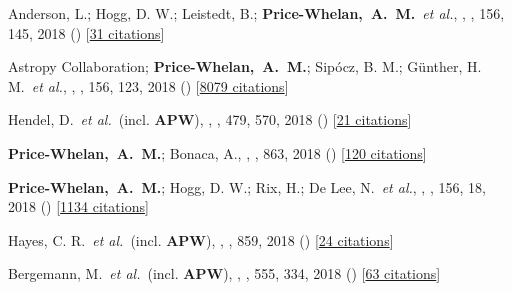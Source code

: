 {\item[{\color{deemph}\scriptsize44}]Anderson, L.; Hogg, D. W.; Leistedt, B.; \textbf{Price-Whelan,~A.~M.}~\textit{et al.}, , \aj, 156, 145, 2018 () [\href{http://adsabs.harvard.edu/abs/2018AJ....156..145A}{31 citations}]

\item[{\color{deemph}\scriptsize43}]Astropy Collaboration; \textbf{Price-Whelan,~A.~M.}; Sip{\'{o}}cz, B. M.; G{\"u}nther, H. M.~\textit{et al.}, , \aj, 156, 123, 2018 () [\href{http://adsabs.harvard.edu/abs/2018AJ....156..123A}{8079 citations}]

\item[{\color{deemph}\scriptsize42}]Hendel, D.~\textit{et al.}~(incl. \textbf{APW}), , \mnras, 479, 570, 2018 () [\href{http://adsabs.harvard.edu/abs/2018MNRAS.479..570H}{21 citations}]

\item[{\color{deemph}\scriptsize41}]\textbf{Price-Whelan,~A.~M.}; Bonaca, A., , \apj, 863, 2018 () [\href{http://adsabs.harvard.edu/abs/2018ApJ...863L..20P}{120 citations}]

\item[{\color{deemph}\scriptsize40}]\textbf{Price-Whelan,~A.~M.}; Hogg, D. W.; Rix, H.; De Lee, N.~\textit{et al.}, , \aj, 156, 18, 2018 () [\href{http://adsabs.harvard.edu/abs/2018AJ....156...18P}{1134 citations}]

\item[{\color{deemph}\scriptsize39}]Hayes, C. R.~\textit{et al.}~(incl. \textbf{APW}), , \apj, 859, 2018 () [\href{http://adsabs.harvard.edu/abs/2018ApJ...859L...8H}{24 citations}]

\item[{\color{deemph}\scriptsize38}]Bergemann, M.~\textit{et al.}~(incl. \textbf{APW}), , \nature, 555, 334, 2018 () [\href{http://adsabs.harvard.edu/abs/2018Natur.555..334B}{63 citations}]

}

